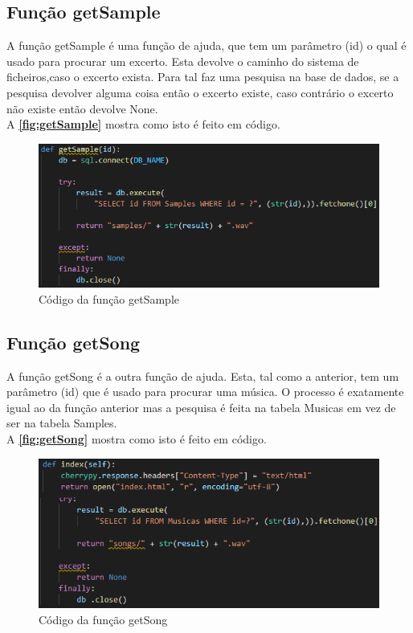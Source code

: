 \documentclass{report}
\begin{document}
\subsection{Função getSample}
\label{ssec:getSample}
A função getSample é uma função de ajuda, que tem um parâmetro (id) o qual é usado para procurar um excerto.
Esta devolve o caminho do sistema de ficheiros,caso o excerto exista.
Para tal faz uma pesquisa na base de dados, se a pesquisa devolver alguma coisa então o excerto existe, caso contrário o excerto não existe então devolve None.\\
A \textbf{\autoref{fig:getSample}} mostra como isto é feito em código.

\begin{figure}[!h]
\center 
\includegraphics[width=330pt]{img/getSample.png}
\caption{Código da função getSample}
\label{fig:getSample}
\end{figure}

\subsection{Função getSong}
\label{ssec:getSong}
A função getSong é a outra função de ajuda.
Esta, tal como a anterior, tem um parâmetro (id) que é usado para procurar uma música.
O processo é exatamente igual ao da função anterior mas a pesquisa é feita na tabela Musicas em vez de ser na tabela Samples.\\
A \textbf{\autoref{fig:getSong}} mostra como isto é feito em código.
\begin{figure}[!h]
\center 
\includegraphics[width=330pt]{img/getSong.png}
\caption{Código da função getSong}
\label{fig:getSong}
\end{figure}
\end{document}
